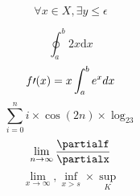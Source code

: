 \documentclass[12pt,a4paper]{article}
\begin{document}
\begin{displaymath}
\forall x \in X, \exists y \leq \epsilon
\end{displaymath}


$$ \oint_a^b {2x} \mathrm{d}x $$
$$f\prime(x) = x\int_a^be^xdx \\$$
$$\sum_{i=0}^n i\times\cos(2n) \times \log_23$$
$$\lim_{n\to\infty} \frac{\partialf}{\partialx}$$
$$\lim_{x \to \infty}, \inf_{x > s} \times \sup_K$$
\end{document}
